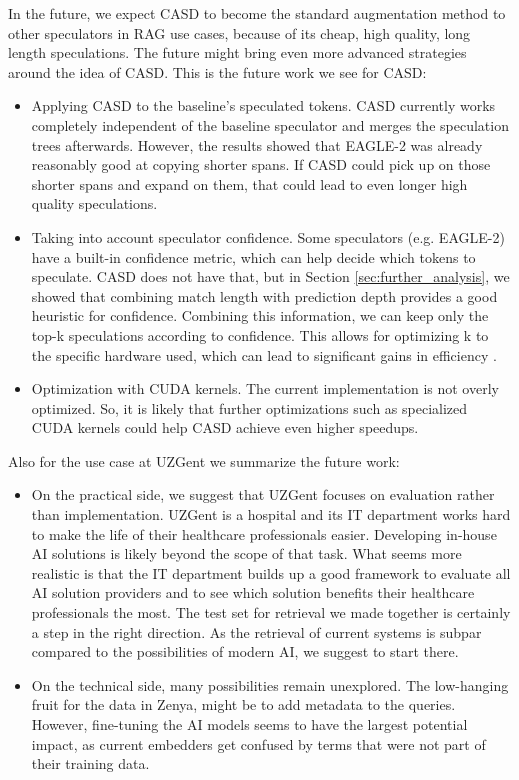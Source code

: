 In the future, we expect CASD to become the standard augmentation method to other speculators in RAG use cases, because of its cheap, high quality, long length speculations. The future might bring even more advanced strategies around the idea of CASD. This is the future work we see for CASD:
\begin{itemize}
    \item Applying CASD to the baseline's speculated tokens. CASD currently works completely independent of the baseline speculator and merges the speculation trees afterwards. However, the results showed that EAGLE-2 was already reasonably good at copying shorter spans. If CASD could pick up on those shorter spans and expand on them, that could lead to even longer high quality speculations.
    \item Taking into account speculator confidence. Some speculators (e.g. EAGLE-2) have a built-in confidence metric, which can help decide which tokens to speculate. CASD does not have that, but in Section \ref{sec:further_analysis}, we showed that combining match length with prediction depth provides a good heuristic for confidence. Combining this information, we can keep only the top-k speculations according to confidence. This allows for optimizing k to the specific hardware used, which can lead to significant gains in efficiency \cite{fernandez2025energy}.
    \item Optimization with CUDA kernels. The current implementation is not overly optimized. So, it is likely that further optimizations such as specialized CUDA kernels could help CASD achieve even higher speedups.
\end{itemize}

Also for the use case at UZGent we summarize the future work:
\begin{itemize}
    \item On the practical side, we suggest that UZGent focuses on evaluation rather than implementation. UZGent is a hospital and its IT department works hard to make the life of their healthcare professionals easier. Developing in-house AI solutions is likely beyond the scope of that task. What seems more realistic is that the IT department builds up a good framework to evaluate all AI solution providers and to see which solution benefits their healthcare professionals the most. The test set for retrieval we made together is certainly a step in the right direction. As the retrieval of current systems is subpar compared to the possibilities of modern AI, we suggest to start there.
    \item On the technical side, many possibilities remain unexplored. The low-hanging fruit for the data in Zenya, might be to add metadata to the queries. However, fine-tuning the AI models seems to have the largest potential impact, as current embedders get confused by terms that were not part of their training data.
\end{itemize}
